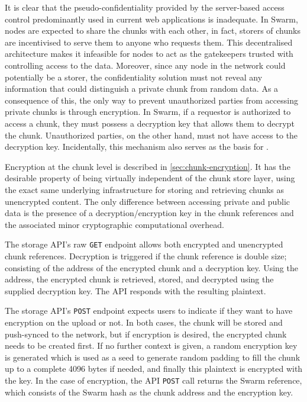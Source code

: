 It is clear that the pseudo-confidentiality provided by the server-based access control predominantly used in current web applications is inadequate. In Swarm, nodes are expected to share the chunks with each other, in fact, storers of chunks are incentivised to serve them to anyone who requests them. This decentralised architecture makes it infeasible for nodes to act as the gatekeepers trusted with controlling access to the data. Moreover, since any node in the network could potentially be a storer, the confidentiality solution must not reveal any information that could distinguish a private chunk from random data. As a consequence of this, the only way to prevent unauthorized parties from accessing private chunks is through encryption. In Swarm, if a requestor is authorized to access a chunk, they must possess a decryption key that allows them to decrypt the chunk. Unauthorized parties, on the other hand, must not have access to the decryption key. Incidentally, this mechanism also serves as the basis for .

Encryption at the chunk level is described in \ref{sec:chunk-encryption}. It 
has the desirable property of being virtually independent of the chunk store layer, using the exact same underlying infrastructure for storing and retrieving chunks as unencrypted content.
The only difference between accessing private and public data is the presence of a decryption/encryption key in the chunk references and the associated minor cryptographic computational overhead.


The storage API's raw \lstinline{GET} endpoint allows both encrypted and unencrypted chunk references. 
Decryption is triggered if the chunk reference is double size; consisting of the address of the encrypted chunk and a decryption key. Using the address, the encrypted chunk is retrieved, stored, and decrypted using the supplied decryption key. The API responds with the resulting plaintext.

The storage API's \lstinline{POST} endpoint expects users to indicate if they want to have encryption on the upload or not. In both cases, the chunk will be stored and push-synced to the network, but if encryption is desired, the encrypted chunk needs to be created first. If no further context is given, a random encryption key is generated which is used as a seed to generate random padding to fill the chunk up to a complete 4096 bytes if needed, and finally this plaintext is encrypted with the key. In the case of encryption, the API \lstinline{POST} call returns the Swarm reference, which consists of the Swarm hash as the chunk address and the encryption key. 

